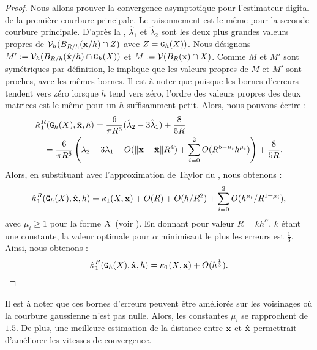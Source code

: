 \begin{proof}
  Nous allons prouver la convergence asymptotique pour l'estimateur digital de la
  première courbure principale. Le raisonnement est le même pour la seconde
  courbure principale. D'après la ,
  $\hat{\lambda}_1$ et $\hat{\lambda}_2$ sont les deux plus grandes valeurs
  propres de $\DCov{h}(\Ball{R/h}{\vx / h} \cap \DigShape)$ avec
  $Z=\DigF{X}{h})$. Nous désignons $M' \EqDef \DCov{h}(\Ball{R/h}{\hat{\vx}/h}
  \cap \DSh)$ et $M \EqDef \Cov(\Ball{R}{\vx} \cap \Shape )$. Comme $M$ et $M'$
  sont symétriques par définition, le  implique que
  les valeurs propres de $M$ et $M'$ sont proches, avec les mêmes bornes. Il est à
  noter que puisque les bornes d'erreurs tendent vers zéro lorsque $h$ tend vers
  zéro, l'ordre des valeurs propres des deux matrices est le même pour un $h$
  suffisamment petit. Alors, nous pouvons écrire :
  \begin{align}
    &\PrincCurvH{1}{R}(\DSh,\hat{\vx},h) = \frac{6}{\pi R^6}(\hat{\lambda}_2 - 3\hat{\lambda}_1) + \frac{8}{5R} \\
    &\quad = \frac{6}{\pi R^6} \left( \lambda_2 - 3\lambda_1 + O(\|\vx-\hat{\vx}\| R^4) + \sum_{i=0}^2 O(R^{5-\mu_i}h^{\mu_i}) \right) + \frac{8}{5R}.
  \end{align}
  Alors, en substituant avec l'approximation de Taylor du
  , nous obtenons :
  \begin{equation} \label{eq:error-term-conv-mean-curv-est}
    \PrincCurvH{1}{R}(\DSh,\hat{\vx},h) = \PrincCurv{1}(\Shape,\vx) + O(R) + O( h/R^2) + \sum_{i=0}^2 O(h^{\mu_i}/R^{1+\mu_i}) ,
  \end{equation}
  avec $\mu_i \ge 1$ pour la forme $\Shape$ (voir
  ). En donnant pour valeur $R =
  kh^\alpha$, $k$ étant une constante, la valeur optimale pour $\alpha$
  minimisant le plus les erreurs est $\frac{1}{3}$. Ainsi, nous obtenons :
  \begin{equation}
    \PrincCurvH{1}{R}(\DSh,\hat{\vx},h) = \PrincCurv{1}(\Shape,\vx) + O(h^{\frac{1}{3}}).
  \end{equation}
\end{proof}
%
Il est à noter que ces bornes d'erreurs peuvent être améliorés sur les
voisinages où la courbure gaussienne n'est pas nulle. Alors, les constantes
$\mu_i$ se rapprochent de $1.5$. De plus, une meilleure estimation de la
distance entre $\vx$ et $\hat{\vx}$ permettrait d'améliorer les vitesses de
convergence.


